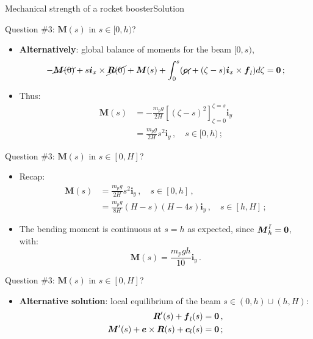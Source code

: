 \documentclass{beamer}
\newcommand{\id}{d}
\newcommand{\cj}{c}
\newcommand{\cv}{{\boldsymbol\cj}}
\newcommand{\xj}{x}
\newcommand{\yj}{y}
\newcommand{\ej}{e}
\renewcommand{\ij}{i}
\newcommand{\ev}{{\boldsymbol\ej}}
\newcommand{\iv}{{\boldsymbol\ij}}
\newcommand{\fj}{f}
\newcommand{\fv}{{\boldsymbol\fj}}
\newcommand{\Fresj}{R}
\newcommand{\Mresj}{M}
\newcommand{\Fres}{{\boldsymbol\Fresj}}
\newcommand{\Mres}{{\boldsymbol\Mresj}}
\newcommand{\bzero}{{\bf 0}}
\begin{document}
\begin{frame}{Mechanical strength of a rocket booster}{Solution}
\begin{overprint}
\vskip-20pt
\begin{exampleblock}{Question \#3: $\Mres(s)$ in $s\in[0,h)$?}
\begin{itemize}
\item {\bf Alternatively}: global balance of moments for the beam $[0,s)$,
\begin{displaymath}
-\cancel{\Mres(0)}+s\iv_\xj\times\cancel{\Fres(0)}+\Mres(s)+\int_0^s(\cancel{\cv_l}+(\zeta-s)\iv_\xj\times\fv_l) \id\zeta=\bzero\,;
\end{displaymath}
\item Thus:
\begin{displaymath}
\begin{split}
\Mres(s) &= -\frac{m_pg}{2H}\left[(\zeta-s)^2\right]_{\zeta=0}^{\zeta=s}\iv_\yj \\
&=\frac{m_p g}{2H}s^2\iv_\yj\,,\quad s\in[0,h)\,;
\end{split}
\end{displaymath}
\end{itemize}
\end{exampleblock}

\vskip-20pt
\begin{exampleblock}{Question \#3: $\Mres(s)$ in $s\in[0,H]$?}
\begin{itemize}
\item Recap:
\begin{displaymath}
\begin{split}
\Mres(s) &=\frac{m_pg}{2H}s^2\iv_\yj\,,\quad s\in[0,h]\,,\\
&=\frac{m_pg}{8H}(H-s)(H-4s)\iv_\yj\,,\quad s\in[h,H]\,;
\end{split}
\end{displaymath}
\item The bending moment is continuous at $s=h$ as expected, since $\Mres_h^I=\bzero$, with:
\begin{displaymath}
\Mres(s)=\frac{m_p g h}{10}\iv_\yj\,.
\end{displaymath}
\begin{displaymath}
\end{displaymath}
\end{itemize}
\end{exampleblock}

\vskip-20pt
\begin{exampleblock}{Question \#3: $\Mres(s)$ in $s\in[0,H]$?}
\begin{itemize}
\item {\bf Alternative solution}: local equilibrium of the beam $s\in(0,h)\cup(h,H)$:
\begin{displaymath}
\begin{split}
\Fres'(s)+\fv_l(s) &=\bzero\,, \\
\Mres'(s)+\ev\times\Fres(s)+\cv_l(s) &=\bzero\,;
\end{split}
\end{displaymath}
\end{itemize}
\end{exampleblock}


\end{overprint}
\end{frame}
\end{document}
